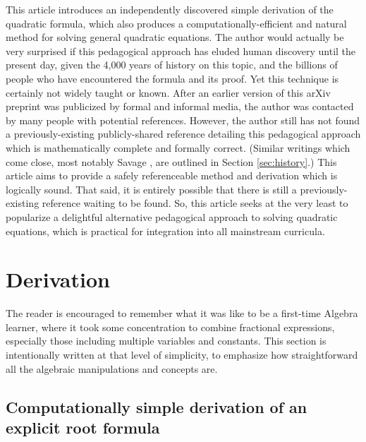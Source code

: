 This article introduces an independently discovered simple derivation of the
quadratic formula, which also produces a computationally-efficient and natural
method for solving general quadratic equations. The author would actually be
very surprised if this pedagogical approach has eluded human discovery until the
present day, given the 4,000 years of history on this topic, and the billions of
people who have encountered the formula and its proof. Yet this technique is
certainly not widely taught or known. After an earlier version of this arXiv
preprint was publicized by formal and informal media, the author was contacted
by many people with potential references. However, the author still has not
found a previously-existing publicly-shared reference detailing this pedagogical
approach which is mathematically complete and formally correct. (Similar
writings which come close, most notably Savage \cite{savage}, are outlined in
Section \ref{sec:history}.) This article aims to provide a safely referenceable
method and derivation which is logically sound. That said, it is entirely
possible that there is still a previously-existing reference waiting to be
found. So, this article seeks at the very least to popularize a delightful
alternative pedagogical approach to solving quadratic equations, which is
practical for integration into all mainstream curricula.


\section{Derivation}

The reader is encouraged to remember what it was like to be a first-time
Algebra learner, where it took some concentration to combine fractional
expressions, especially those including multiple variables and constants.
This section is intentionally written at that level of simplicity, to
emphasize how straightforward all the algebraic manipulations and concepts
are.

\subsection{Computationally simple derivation of an explicit root formula}
\label{sec:monic}


